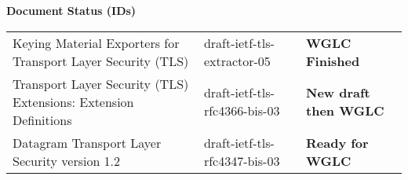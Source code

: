 \documentclass[helvetica]{seminar}
\newcommand{\heading}[1]{%
  \begin{center} 
    \large\bf 
    #1 
  \end{center} 
  \vspace{.4 in}}
\begin{document}
\begin{slide}
\heading{Document Status (IDs)}

{\tiny
\begin{tabular}{|p{1.5 in}|p{1.4 in}|p{.7 in}|}
\hline
Keying Material Exporters for Transport Layer Security (TLS) & draft-ietf-tls-extractor-05 & \textbf{WGLC Finished} \\
Transport Layer Security (TLS) Extensions: Extension Definitions & draft-ietf-tls-rfc4366-bis-03 & \textbf{New draft then WGLC} \\
Datagram Transport Layer Security version 1.2 & draft-ietf-tls-rfc4347-bis-03 & \textbf{Ready for WGLC} \\
\hline
\end{tabular}
}


\end{slide}
\end{document}
